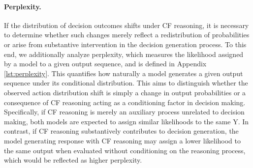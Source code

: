 \documentclass{article}
\begin{document}
\paragraph{Perplexity.} 
If the distribution of decision outcomes shifts under CF reasoning, it is necessary to determine whether such changes merely reflect a redistribution of probabilities or arise from substantive intervention in the decision generation process. To this end, we additionally analyze perplexity, which measures the likelihood assigned by a model to a given output sequence, and is defined in Appendix \ref{lst:perplexity}. This quantifies how naturally a model generates a given output sequence under its conditional distribution. This aims to distinguish whether the observed action distribution shift is simply a change in output probabilities or a consequence of CF reasoning acting as a conditioning factor in decision making. Specifically, if CF reasoning is merely an auxiliary process unrelated to decision making, both models are expected to assign similar likelihoods to the same Y. In contrast, if CF reasoning substantively contributes to decision generation, the model generating response with CF reasoning may assign a lower likelihood to the same output when evaluated without conditioning on the reasoning process, which would be reflected as higher perplexity.


\end{document}
